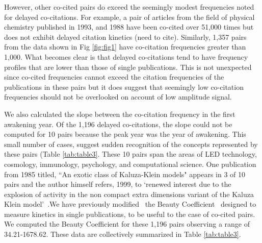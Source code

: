 \documentclass[utf8]{frontiersSCNS}
\begin{document}
However, other co-cited pairs do exceed the seemingly modest frequencies noted for delayed co-citations. For example, a pair of articles from the field of physical chemistry published in 1993, and 1988 have been co-cited over 51,000 times but does not exhibit delayed citation kinetics (need to cite). Similarly, 1,357 pairs from the data shown in Fig \ref{fig:fig1} have co-citation frequencies greater than 1,000. What becomes clear is that delayed co-citations tend to have frequency profiles that are lower than those of single publications. This is not unexpected since co-cited frequencies cannot exceed the citation frequencies of the publications in these pairs but it does suggest that seemingly low co-citation frequencies should not be overlooked on account of low amplitude signal. 

We also calculated the slope between the co-citation frequency in the first awakening year.  Of the 1,196 delayed co-citations, the slope could not be computed for 10 pairs because the peak year was the year of awakening. This small number of cases, suggest sudden recognition of the concepts represented by these pairs (Table \ref{tab:table3}. These 10 pairs span the areas of LED technology, cosmology, immunology, psychology, and computational science. One publication from 1985 titled, ``An exotic class of Kaluza-Klein models" appears in 3 of 10 pairs and the author himself refers, 1999, to `renewed interest due to the explosion of activity in the non compact extra dimensions variant of the Kaluza Klein model'~\citep{visser_1999}.We have previously modified~\citep{devarakonda_2020}  the Beauty Coefficient~\citep{Ke2015} designed to measure kinetics in single publications, to be useful to the case of co-cited pairs. We computed the Beauty Coefficient for these 1,196 pairs observing a range of 34.21-1678.62. These data are collectively summarized in Table \ref{tab:table3}.  
\end{document}
